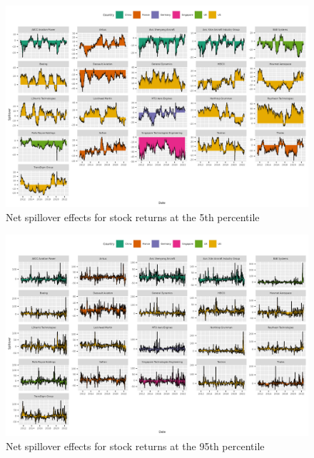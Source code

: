 \documentclass[
  letterpaper,
  DIV=11,
  numbers=noendperiod]{scrartcl}
\begin{document}
\begin{figure}[H]

{\centering \includegraphics{plots/fig-rtnnet5.png}

}

\caption{\label{fig-rtnet5}Net spillover effects for stock returns at
the 5th percentile}

\end{figure}

\begin{figure}[H]

{\centering \includegraphics{plots/fig-rtnnet95.png}

}

\caption{\label{fig-rtnet95}Net spillover effects for stock returns at
the 95th percentile}

\end{figure}
\end{document}
